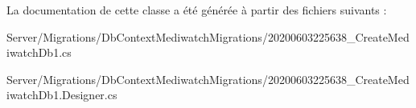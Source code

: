 La documentation de cette classe a été générée à partir des fichiers suivants \+:\begin{DoxyCompactItemize}
\item 
Server/\+Migrations/\+Db\+Context\+Mediwatch\+Migrations/20200603225638\+\_\+\+Create\+Mediwatch\+Db1.\+cs\item 
Server/\+Migrations/\+Db\+Context\+Mediwatch\+Migrations/20200603225638\+\_\+\+Create\+Mediwatch\+Db1.\+Designer.\+cs\end{DoxyCompactItemize}
